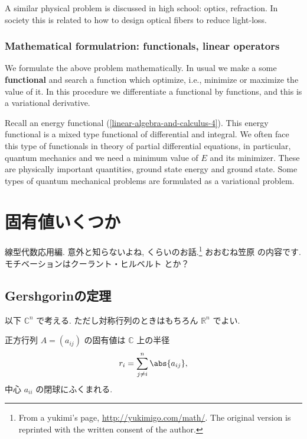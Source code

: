 \documentclass[openany, a4paper, oneside]{jsbook}
\begin{document}
A similar physical problem is discussed in high school: optics, refraction.
In society this is related to how to design optical fibers to reduce light-loss.
\subsection{Mathematical formulatrion: functionals, linear operators}

We formulate the above problem mathematically.
In usual we make a some \textbf{functional} and search a function
which optimize, i.e., minimize or maximize the value of it.
In this procedure we differentiate a functional by functions,
and this is a variational derivative.

Recall an energy functional (\ref{linear-algebra-and-calculus-4}).
This energy functional is a mixed type functional of differential and integral.
We often face this type of functionals in theory of partial differential equations,
in particular, quantum mechanics and we need a minimum value of $E$ and its minimizer.
These are physically important quantities, ground state energy and ground state.
Some types of quantum mechanical problems are formulated as a variational problem.
\chapter{固有値いくつか}

線型代数応用編. 意外と知らないよね, くらいのお話.\footnote{From a yukimi's page, \url{http://yukimigo.com/math/}.
The original version is reprinted with the written consent of the author.}
おおむね笠原 \cite{KoujiKasahara1}の内容です.
モチベーションはクーラント・ヒルベルト \cite{CourantHilbert1}とか？


\section{Gershgorinの定理}

以下 $\mathbb{C}^n$ で考える. ただし対称行列のときはもちろん $\mathbb{R}^n$  でよい.
\begin{thm}[Gershgorinの定理]
 正方行列 $A = (a_{ij})$ の固有値は $\mathbb{C}$ 上の半径
  \begin{align}
   r_i
   =
   \sum_{j\neq i}^n \abs{a_{ij}},
  \end{align}
 中心 $a_{ii}$ の閉球にふくまれる.
\end{thm}
\end{document}
